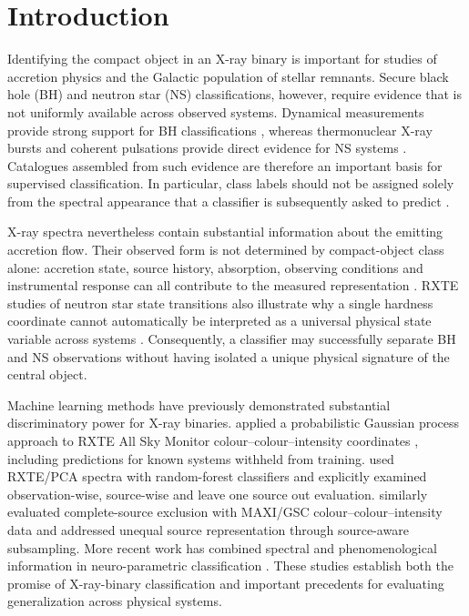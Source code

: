 \documentclass[final,5p,authoryear,nopreprintline]{elsarticle}
\begin{document}
\section{Introduction}
\label{sec:1}

Identifying the compact object in an X-ray binary is important for studies of accretion physics and the Galactic population of stellar remnants. Secure black hole (BH) and neutron star (NS) classifications, however, require evidence that is not uniformly available across observed systems. Dynamical measurements provide strong support for BH classifications \citep{CorralSantana2016}, whereas thermonuclear X-ray bursts and coherent pulsations provide direct evidence for NS systems \citep{Galloway2020,Sanna2018}. Catalogues assembled from such evidence are therefore an important basis for supervised classification. In particular, class labels should not be assigned solely from the spectral appearance that a classifier is subsequently asked to predict \citep{CorralSantana2016,Galloway2020}.

X-ray spectra nevertheless contain substantial information about the emitting accretion flow. Their observed form is not determined by compact-object class alone: accretion state, source history, absorption, observing conditions and instrumental response can all contribute to the measured representation \citep{Belloni2005,Gladstone2007,Jahoda2006}. RXTE studies of neutron star state transitions also illustrate why a single hardness coordinate cannot automatically be interpreted as a universal physical state variable across systems \citep{Gladstone2007}. Consequently, a classifier may successfully separate BH and NS observations without having isolated a unique physical signature of the central object.

Machine learning methods have previously demonstrated substantial discriminatory power for X-ray binaries. \citet{Gopalan2015} applied a probabilistic Gaussian process approach to RXTE All Sky Monitor colour--colour--intensity coordinates \citep{Vrtilek2013}, including predictions for known systems withheld from training. \citet{Pattnaik2021} used RXTE/PCA spectra with random-forest classifiers and explicitly examined observation-wise, source-wise and leave one source out evaluation. \citet{deBeurs2022} similarly evaluated complete-source exclusion with MAXI/GSC colour--colour--intensity data and addressed unequal source representation through source-aware subsampling. More recent work has combined spectral and phenomenological information in neuro-parametric classification \citep{Garg2026}. These studies establish both the promise of X-ray-binary classification and important precedents for evaluating generalization across physical systems.
\end{document}
